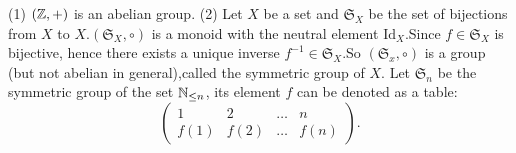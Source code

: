 \documentclass{book}
\numberwithin{equation}{section}
\begin{document}
\begin{exampleenv}
    \quad
    \newline
    (1) $(\mathbb{Z},+)$ is an abelian group.
    \newline
    (2) Let $X$ be a set and $\mathfrak{S}_X$ be the set of bijections from $X$ to $X$.$(\mathfrak{S}_X ,\circ)$ is a monoid with the neutral element $\mathrm{Id}_X$.Since $f\in \mathfrak{S}_X $ is bijective, hence there exists a unique inverse $f^{-1}\in \mathfrak{S} _X$.So $(\mathfrak{S} _x,\circ)$ is a group (but not abelian in general),called the symmetric group of $X$.
    \newline
    Let $\mathfrak{S} _n$ be the symmetric group of the set $\mathbb{N}_{\le n}$, its element $f$ can be denoted as a table:
    $$\begin{pmatrix}
  1&2  &\dots &n \\
  f(1)& f(2) &\dots   &f(n)
\end{pmatrix}.$$
\end{exampleenv}
\end{document}
